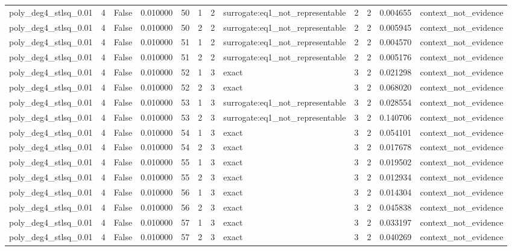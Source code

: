 \begin{tabular}{lrrrrrrlrrrl}
poly\_deg4\_stlsq\_0.01 & 4 & False & 0.010000 & 50 & 1 & 2 & surrogate:eq1\_not\_representable & 2 & 2 & 0.004655 & context\_not\_evidence \\
poly\_deg4\_stlsq\_0.01 & 4 & False & 0.010000 & 50 & 2 & 2 & surrogate:eq1\_not\_representable & 2 & 2 & 0.005945 & context\_not\_evidence \\
poly\_deg4\_stlsq\_0.01 & 4 & False & 0.010000 & 51 & 1 & 2 & surrogate:eq1\_not\_representable & 2 & 2 & 0.004570 & context\_not\_evidence \\
poly\_deg4\_stlsq\_0.01 & 4 & False & 0.010000 & 51 & 2 & 2 & surrogate:eq1\_not\_representable & 2 & 2 & 0.005176 & context\_not\_evidence \\
poly\_deg4\_stlsq\_0.01 & 4 & False & 0.010000 & 52 & 1 & 3 & exact & 3 & 2 & 0.021298 & context\_not\_evidence \\
poly\_deg4\_stlsq\_0.01 & 4 & False & 0.010000 & 52 & 2 & 3 & exact & 3 & 2 & 0.068020 & context\_not\_evidence \\
poly\_deg4\_stlsq\_0.01 & 4 & False & 0.010000 & 53 & 1 & 3 & surrogate:eq1\_not\_representable & 3 & 2 & 0.028554 & context\_not\_evidence \\
poly\_deg4\_stlsq\_0.01 & 4 & False & 0.010000 & 53 & 2 & 3 & surrogate:eq1\_not\_representable & 3 & 2 & 0.140706 & context\_not\_evidence \\
poly\_deg4\_stlsq\_0.01 & 4 & False & 0.010000 & 54 & 1 & 3 & exact & 3 & 2 & 0.054101 & context\_not\_evidence \\
poly\_deg4\_stlsq\_0.01 & 4 & False & 0.010000 & 54 & 2 & 3 & exact & 3 & 2 & 0.017678 & context\_not\_evidence \\
poly\_deg4\_stlsq\_0.01 & 4 & False & 0.010000 & 55 & 1 & 3 & exact & 3 & 2 & 0.019502 & context\_not\_evidence \\
poly\_deg4\_stlsq\_0.01 & 4 & False & 0.010000 & 55 & 2 & 3 & exact & 3 & 2 & 0.012934 & context\_not\_evidence \\
poly\_deg4\_stlsq\_0.01 & 4 & False & 0.010000 & 56 & 1 & 3 & exact & 3 & 2 & 0.014304 & context\_not\_evidence \\
poly\_deg4\_stlsq\_0.01 & 4 & False & 0.010000 & 56 & 2 & 3 & exact & 3 & 2 & 0.045838 & context\_not\_evidence \\
poly\_deg4\_stlsq\_0.01 & 4 & False & 0.010000 & 57 & 1 & 3 & exact & 3 & 2 & 0.033197 & context\_not\_evidence \\
poly\_deg4\_stlsq\_0.01 & 4 & False & 0.010000 & 57 & 2 & 3 & exact & 3 & 2 & 0.040269 & context\_not\_evidence \\

\end{tabular}
